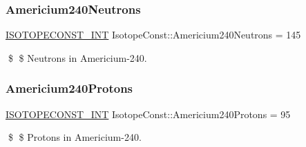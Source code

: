 \subsubsection{\texorpdfstring{Americium240\+Neutrons}{Americium240Neutrons}}
{\footnotesize\ttfamily \mbox{\hyperlink{group___isotope_const-_macros_ga5f18360b3e99483a35c32d789e62621c}{I\+S\+O\+T\+O\+P\+E\+C\+O\+N\+S\+T\+\_\+\+I\+NT}} Isotope\+Const\+::\+Americium240\+Neutrons = 145}

\$ \$ Neutrons in Americium-\/240. \mbox{\label{group___isotope_const-_americium-_am240_ga3bd7e460c388997c7329af5ac989be69}} 
\subsubsection{\texorpdfstring{Americium240\+Protons}{Americium240Protons}}
{\footnotesize\ttfamily \mbox{\hyperlink{group___isotope_const-_macros_ga5f18360b3e99483a35c32d789e62621c}{I\+S\+O\+T\+O\+P\+E\+C\+O\+N\+S\+T\+\_\+\+I\+NT}} Isotope\+Const\+::\+Americium240\+Protons = 95}

\$ \$ Protons in Americium-\/240. 